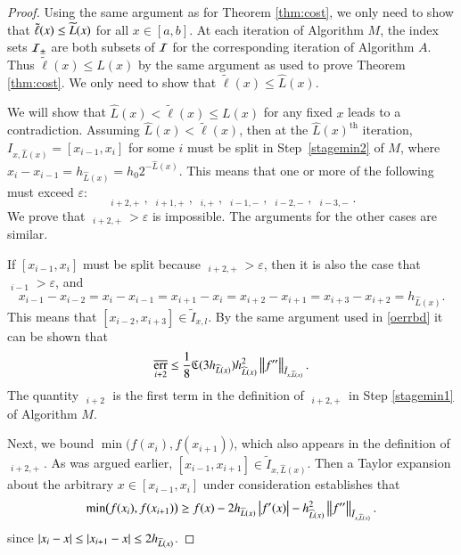 \documentclass[review]{elsarticle}
\newcommand{\abstol}{\varepsilon}
\theoremstyle{definition}
\newcommand{\tell}{\tilde{\ell}}
\newcommand{\chL}{\widehat{L}}
\DeclareMathOperator{\oerr}{\overline{err}}
\DeclareMathOperator{\herr}{\widehat{err}}
\begin{document}
\begin{proof}

Using the same argument as for Theorem \ref{thm:cost}, we only need to show that
$\tell(x) \le \tL(x)$ for all $x \in [a,b]$.  At each iteration of Algorithm $M$, the index sets 
$\mathcal{I}_{\pm}$ are both subsets of $\mathcal{I}$ for the corresponding iteration of Algorithm $A$.  
Thus $\tell(x)
\le L(x)$ by the same argument as used to prove Theorem \ref{thm:cost}.  We
only need to show that $\tell(x) \le \chL(x)$.
	
We will show that $\chL(x) < \tell(x) \le L(x)$ for any fixed $x$  leads to a contradiction.  
Assuming $\chL(x) < \tell(x)$, then at the $\chL(x)^{\text{th}}$  iteration,
$I_{x,\chL(x)} = [x_{i-1},x_i]$ for some $i$ must be split in Step~\ref{stagemin2} of $M$,
where $x_i-x_{i-1}= h_{\chL(x)} = h_0 2^{-\chL(x)}$.  This means that one or more of the
following must exceed $\abstol$:
\[
\herr_{i+2,+} , \ \herr_{i+1,+}, \ \herr_{i,+}, \  \herr_{i-1,-}, \ \herr_{i-2,-}, \ \herr_{i-3,-}.
\]
We prove that $\herr_{i+2,+} > \abstol$ is impossible.  The arguments for the other cases 
are similar.

If $[x_{i-1},x_i]$ must be split because $\herr_{i+2,+} > \abstol$, then it is also the case 
that $\oerr_{i-1} > \abstol$, and 
\[
x_{i-1} - x_{i-2} = x_i - x_{i-1} = x_{i+1} - x_i = x_{i+2} - x_{i+1}  = x_{i+3} - x_{i+2} 
= h_{\chL(x)}.
\]
This means that $[x_{i-2},x_{i+3}] \in \tilde{I}_{x,l}$. By the same argument used in 
\eqref{oerrbd} it can be shown that
\begin{equation}
\oerr_{i+2} \le \frac{1}{8} \fC(3 h_{\chL(x)}) h_{\chL(x)}^2 \norm[\tilde{I}_{x,\chL(x)}]{f''}. 
\label{oerrupbd}
\end{equation}
The quantity $\oerr_{i+2}$ is the first term in the definition of $\herr_{i+2,+}$ in Step 
\ref{stagemin1} of Algorithm $M$.

Next, we bound $\min\bigl(f(x_{i}),f(x_{i+1}) \bigr)$, which also appears in the
definition of $\herr_{i+2,+}$. As was argued earlier, $[x_{i-1},x_{i+1}] \in
\tilde{I}_{x,\chL(x)}$. Then a Taylor expansion about the arbitrary $x \in [x_{i-1},x_{i}] $ 
under consideration establishes that
\begin{equation} \label{minfjjm1bd}
\min\bigl(f(x_{i}),f(x_{i+1}) \bigr)
\ge f(x) - 2h_{\chL(x)}\abs{f'(x)} - h_{\chL(x)}^2 \norm[\bar{I}_{x,\chL(x)}]{f''} .
\end{equation}
since $\abs{x_i - x} \le \abs{x_{i+1} - x} \le 2h_{\chL(x)}$.


\end{proof}
\end{document}
